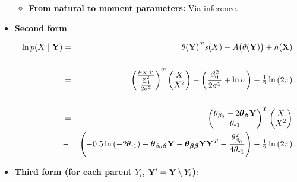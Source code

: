 \documentclass[11pt, oneside]{article}   	%
\DeclareMathOperator*{\E}{\mbox{\large E}}
\numberwithin{figure}{section}
\numberwithin{equation}{section}
\numberwithin{table}{section}
\theoremstyle{definition}
\begin{document}
\begin{appendices}
\begin{itemize}
\begin{itemize}
\item \textbf{From natural to moment parameters:}
Via inference.

\end{itemize}

\vspace{0.5in}
\item \textbf{Second form}:

\begin{eqnarray}\label{NormalGNomal2form}
\ln p(X\mid \mathbf{Y}) &=& \theta(\mathbf{Y})^T s(X) - A \big(\theta(\mathbf{Y})\big) + h(\mathbf{X})\\\nonumber\\
&=&
\begin{pmatrix}
\frac{\mu_{X|Y}}{\sigma^2} \nonumber\\
\frac{-1}{2\sigma^2} \nonumber\\
\end{pmatrix}^T
\begin{pmatrix}
X\\
X^2\\
\end{pmatrix}
- \left( \frac{\beta_0^2}{2\sigma^2} + \ln{\sigma}\right) - \tfrac{1}{2}\ln{(2\pi)} \nonumber\\\nonumber\\
&=&
\begin{pmatrix}
\theta_{\beta_0}+2\boldsymbol \theta_{\boldsymbol \beta} \mathbf Y \nonumber\\
\theta_{\mbox{-}1} \nonumber\\
\end{pmatrix}^T
\begin{pmatrix}
X \nonumber\\
X^2 \nonumber\\
\end{pmatrix}\nonumber\\
&-& 
\left(-0.5\ln{(-2\theta_{\mbox{-}1})} - \boldsymbol \theta_{\beta_0\boldsymbol \beta} \mathbf Y - \boldsymbol \theta_{\boldsymbol \beta\boldsymbol \beta}\mathbf Y\mathbf Y^T -\frac{\theta_{\beta_0}^2}{4\theta_{\mbox{-}1}}\right) - \tfrac{1}{2}\ln{(2\pi)} \nonumber
\end{eqnarray}



\vspace{0.2in}
\item \textbf{Third form (for each parent $Y_i$, $\mathbf Y' = \mathbf Y \setminus Y_i $)}: 


\end{itemize}
\end{appendices}
\end{document}

